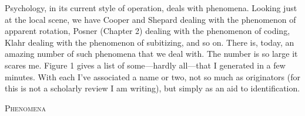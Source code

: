 \documentclass{paper}
\begin{document}
Psychology, in its current style of operation, deals with phenomena. Looking just at the local scene, we have Cooper and Shepard dealing with the phenomenon of apparent rotation, Posner (Chapter 2) dealing with the phenomenon of coding, Klahr dealing with the phenomenon of subitizing, and so on. There is, today, an amazing number of such phenomena that we deal with. The number is so large it scares me. Figure 1 gives a list of some---hardly all---that I generated in a few minutes. With each I've associated a name or two, not so much as originators (for this is not a scholarly review I am writing), but simply as an aid to identification.
\begin{table}
\begin{center}
\textsc{Phenomena}
\vspace{2ex}


\end{center}
\end{table}
\end{document}

